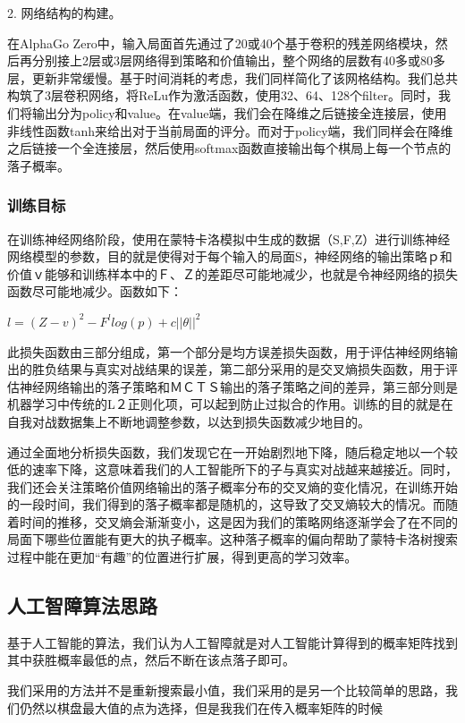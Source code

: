 \documentclass[a4paper]{article}
\begin{document}
\begin{multicols}{2}
2. 网络结构的构建。\par
在AlphaGo Zero中，输入局面首先通过了20或40个基于卷积的残差网络模块，然后再分别接上2层或3层网络得到策略和价值输出，整个网络的层数有40多或80多层，更新非常缓慢。\cite{AI2}基于时间消耗的考虑，我们同样简化了该网格结构。我们总共构筑了3层卷积网络，将ReLu作为激活函数，使用32、64、128个filter。同时，我们将输出分为policy和value。在value端，我们会在降维之后链接全连接层，使用非线性函数tanh来给出对于当前局面的评分。而对于policy端，我们同样会在降维之后链接一个全连接层，然后使用softmax函数直接输出每个棋局上每一个节点的落子概率。\par
\subsubsection{训练目标}
	在训练神经网络阶段，使用在蒙特卡洛模拟中生成的数据（S,F,Z）进行训练神经网络模型的参数，目的就是使得对于每个输入的局面S，神经网络的输出策略ｐ和价值ｖ能够和训练样本中的Ｆ、Ｚ的差距尽可能地减少，也就是令神经网络的损失函数尽可能地减少。函数如下：\par
$l=(Z-v)^{2}-F^{l}log(p)+c||\theta||^{2}$\par
此损失函数由三部分组成，第一个部分是均方误差损失函数，用于评估神经网络输出的胜负结果与真实对战结果的误差，第二部分采用的是交叉熵损失函数，用于评估神经网络输出的落子策略和ＭＣＴＳ输出的落子策略之间的差异，第三部分则是机器学习中传统的L２正则化项，可以起到防止过拟合的作用。训练的目的就是在自我对战数据集上不断地调整参数，以达到损失函数减少地目的。\cite{k9}\par
通过全面地分析损失函数，我们发现它在一开始剧烈地下降，随后稳定地以一个较低的速率下降，这意味着我们的人工智能所下的子与真实对战越来越接近。同时，我们还会关注策略价值网络输出的落子概率分布的交叉熵的变化情况，在训练开始的一段时间，我们得到的落子概率都是随机的，这导致了交叉熵较大的情况。而随着时间的推移，交叉熵会渐渐变小，这是因为我们的策略网络逐渐学会了在不同的局面下哪些位置能有更大的执子概率。这种落子概率的偏向帮助了蒙特卡洛树搜索过程中能在更加“有趣”的位置进行扩展，得到更高的学习效率。\par
\subsection{人工智障算法思路}
基于人工智能的算法，我们认为人工智障就是对人工智能计算得到的概率矩阵找到其中获胜概率最低的点，然后不断在该点落子即可。\par
我们采用的方法并不是重新搜索最小值，我们采用的是另一个比较简单的思路，我们仍然以棋盘最大值的点为选择，但是我我们在传入概率矩阵的时候





\end{multicols}
\end{document}
